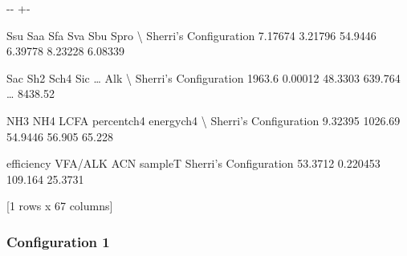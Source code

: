 \documentclass[a4paper,10pt,english]{sphinxmanual}
\newlength\nbsphinxcodecellspacing
\begin{document}
{

\kern-\sphinxverbatimsmallskipamount\kern-\baselineskip
\kern+\FrameHeightAdjust\kern-\fboxrule
\vspace{\nbsphinxcodecellspacing}

\begin{sphinxVerbatim}[commandchars=\\\{\}]
\llap{\color{nbsphinxout}[10]:\,\hspace{\fboxrule}\hspace{\fboxsep}}                           Ssu      Saa      Sfa      Sva      Sbu     Spro   \textbackslash{}
Sherri's Configuration  7.17674  3.21796  54.9446  6.39778  8.23228  6.08339

                          Sac      Sh2     Sch4      Sic   {\ldots}     Alk   \textbackslash{}
Sherri's Configuration  1963.6  0.00012  48.3303  639.764  {\ldots}  8438.52

                           NH3      NH4     LCFA    percentch4    energych4   \textbackslash{}
Sherri's Configuration  9.32395  1026.69  54.9446        56.905       65.228

                        efficiency   VFA/ALK      ACN  sampleT
Sherri's Configuration     53.3712  0.220453  109.164  25.3731

[1 rows x 67 columns]
\end{sphinxVerbatim}
}


\subsubsection{Configuration 1}
\label{\detokenize{jupyter_notebook/ADM1F_SRT_2phase:Configuration-1}}
{
\begin{sphinxVerbatim}[commandchars=\\\{\}]
\llap{\color{nbsphinxin}[11]:\,\hspace{\fboxrule}\hspace{\fboxsep}}
  
    \PYG{p}{[}\PYG{p}{]} \PYG{p}{[}\PYG{p}{]}
\end{sphinxVerbatim}
}
\end{document}
